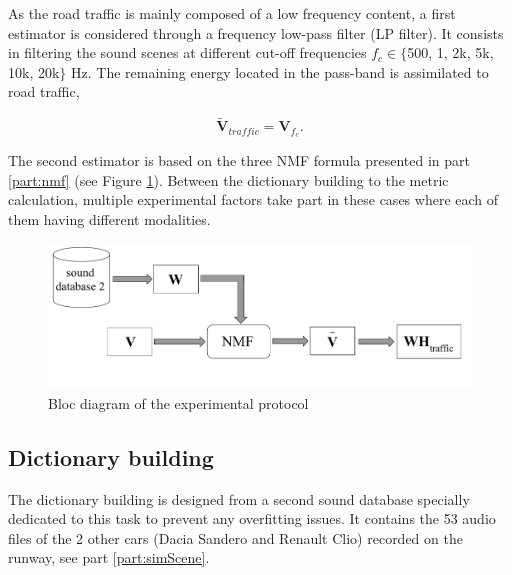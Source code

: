 \documentclass[review,5p,twocolumn,sort&compress,times]{elsarticle}
\begin{document}
As the road traffic is mainly composed of a low frequency content, a first estimator is considered through a frequency low-pass filter (LP filter). It consists in filtering the sound scenes at different cut-off frequencies $f_c \in \lbrace$500, 1, 2k, 5k, 10k, 20k$\rbrace$ Hz. The remaining energy located in the pass-band is assimilated to road traffic, 

\begin{equation}
\mathbf{\tilde{V}}_{traffic} = \mathbf{V}_{f_c}.
\end{equation}

The second estimator is based on the three NMF formula presented in part \ref{part:nmf} (see Figure \ref{fig:bloc_diagram_nmf}). Between the dictionary building to the metric calculation, multiple experimental factors take part in these cases where each of them having different modalities.

\begin{figure}[t]
\centering
\includegraphics[width=.9\linewidth]{figures/bloc_diagram_NMF_EN_2.pdf}
\caption{Bloc diagram of the experimental protocol}
\label{fig:bloc_diagram_nmf}
\end{figure}

\subsection{Dictionary building}\label{part:dictionary_building}
The dictionary building is designed from a second sound database specially dedicated to this task to prevent any overfitting issues. It contains the 53 audio files of the 2 other cars (Dacia Sandero and Renault Clio) recorded on the runway, see part \ref{part:simScene}. 
\end{document}
